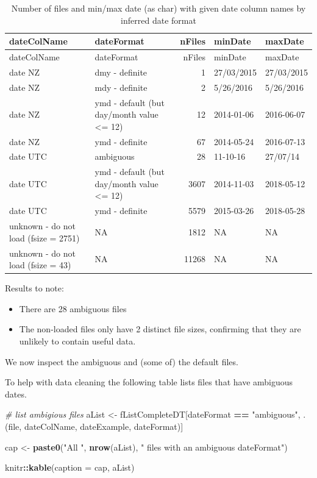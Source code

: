 \documentclass[]{article}
\newenvironment{Shaded}{\begin{snugshade}}{\end{snugshade}}
\newcommand{\KeywordTok}[1]{\textcolor[rgb]{0.13,0.29,0.53}{\textbf{#1}}}
\newcommand{\DataTypeTok}[1]{\textcolor[rgb]{0.13,0.29,0.53}{#1}}
\newcommand{\StringTok}[1]{\textcolor[rgb]{0.31,0.60,0.02}{#1}}
\newcommand{\CommentTok}[1]{\textcolor[rgb]{0.56,0.35,0.01}{\textit{#1}}}
\newcommand{\OperatorTok}[1]{\textcolor[rgb]{0.81,0.36,0.00}{\textbf{#1}}}
\newcommand{\NormalTok}[1]{#1}
\providecommand{\tightlist}{%
  \setlength{\itemsep}{0pt}\setlength{\parskip}{0pt}}
\begin{document}
\begin{longtable}[]{@{}llrll@{}}
\caption{Number of files and min/max date (as char) with given date
column names by inferred date format}\tabularnewline
\toprule
dateColName & dateFormat & nFiles & minDate & maxDate\tabularnewline
\midrule
\endfirsthead
\toprule
dateColName & dateFormat & nFiles & minDate & maxDate\tabularnewline
\midrule
\endhead
date NZ & dmy - definite & 1 & 27/03/2015 & 27/03/2015\tabularnewline
date NZ & mdy - definite & 2 & 5/26/2016 & 5/26/2016\tabularnewline
date NZ & ymd - default (but day/month value \textless{}= 12) & 12 &
2014-01-06 & 2016-06-07\tabularnewline
date NZ & ymd - definite & 67 & 2014-05-24 & 2016-07-13\tabularnewline
date UTC & ambiguous & 28 & 11-10-16 & 27/07/14\tabularnewline
date UTC & ymd - default (but day/month value \textless{}= 12) & 3607 &
2014-11-03 & 2018-05-12\tabularnewline
date UTC & ymd - definite & 5579 & 2015-03-26 &
2018-05-28\tabularnewline
unknown - do not load (fsize = 2751) & NA & 1812 & NA &
NA\tabularnewline
unknown - do not load (fsize = 43) & NA & 11268 & NA & NA\tabularnewline
\bottomrule
\end{longtable}

Results to note:

\begin{itemize}
\tightlist
\item
  There are 28 ambiguous files
\item
  The non-loaded files only have 2 distinct file sizes, confirming that
  they are unlikely to contain useful data.
\end{itemize}

We now inspect the ambiguous and (some of) the default files.

To help with data cleaning the following table lists files that have
ambiguous dates.

\begin{Shaded}
\begin{Highlighting}[]
\CommentTok{# list ambigious files}
\NormalTok{aList <-}\StringTok{ }\NormalTok{fListCompleteDT[dateFormat }\OperatorTok{==}\StringTok{ "ambiguous"}\NormalTok{, }
\NormalTok{                         .(file, dateColName, dateExample, dateFormat)]}

\NormalTok{cap <-}\StringTok{ }\KeywordTok{paste0}\NormalTok{(}\StringTok{"All "}\NormalTok{, }\KeywordTok{nrow}\NormalTok{(aList), }
              \StringTok{" files with an ambiguous dateFormat"}\NormalTok{)}

\NormalTok{knitr}\OperatorTok{::}\KeywordTok{kable}\NormalTok{(}\DataTypeTok{caption =}\NormalTok{ cap, aList)}
\end{Highlighting}
\end{Shaded}
\end{document}
